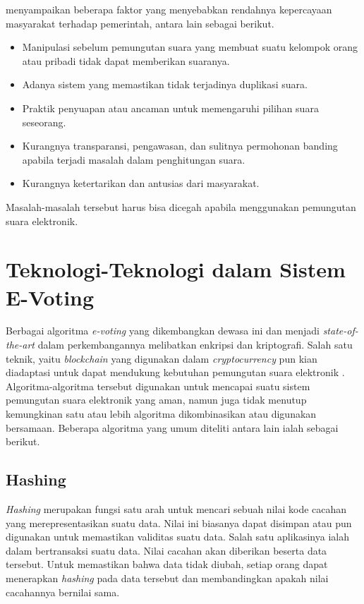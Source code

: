 \cite{8651451} menyampaikan beberapa faktor yang menyebabkan rendahnya kepercayaan masyarakat terhadap pemerintah, antara lain sebagai berikut.

\begin{itemize}
    \setlength\itemsep{-0.5em}
    \item Manipulasi sebelum pemungutan suara yang membuat suatu kelompok orang atau pribadi tidak dapat memberikan suaranya.
    \item Adanya sistem yang memastikan tidak terjadinya duplikasi suara.
    \item Praktik penyuapan atau ancaman untuk memengaruhi pilihan suara seseorang.
    \item Kurangnya transparansi, pengawasan, dan sulitnya permohonan banding apabila terjadi masalah dalam penghitungan suara.
    \item Kurangnya ketertarikan dan antusias dari masyarakat.
\end{itemize}

Masalah-masalah tersebut harus bisa dicegah apabila menggunakan pemungutan suara elektronik.

\section{Teknologi-Teknologi dalam Sistem E-Voting}

Berbagai algoritma \textit{e-voting} yang dikembangkan dewasa ini dan menjadi \textit{state-of-the-art} dalam perkembangannya melibatkan enkripsi dan kriptografi. Salah satu teknik, yaitu \textit{blockchain} yang digunakan dalam \textit{cryptocurrency} pun kian diadaptasi untuk dapat mendukung kebutuhan pemungutan suara elektronik \citep{8651451}. Algoritma-algoritma tersebut digunakan untuk mencapai suatu sistem pemungutan suara elektronik yang aman, namun juga tidak menutup kemungkinan satu atau lebih algoritma dikombinasikan atau digunakan bersamaan. Beberapa algoritma yang umum diteliti antara lain ialah sebagai berikut.

\subsection{Hashing}

\textit{Hashing} merupakan fungsi satu arah untuk mencari sebuah nilai kode cacahan yang merepresentasikan suatu data. Nilai ini biasanya dapat disimpan atau pun digunakan untuk memastikan validitas suatu data. Salah satu aplikasinya ialah dalam bertransaksi suatu data. Nilai cacahan akan diberikan beserta data tersebut. Untuk memastikan bahwa data tidak diubah, setiap orang dapat menerapkan \textit{hashing} pada data tersebut dan membandingkan apakah nilai cacahannya bernilai sama.

